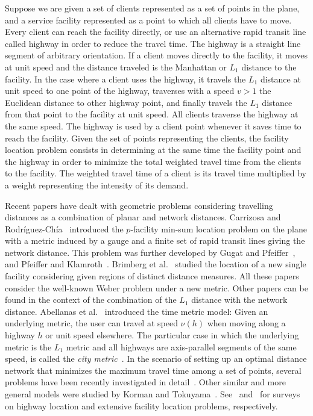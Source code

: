 \documentclass[11pt,a4paper,oneside,onecolumn]{article}
\begin{document}
Suppose we are given a set of clients represented as a set of points in
the plane, and a service facility represented as a point to which
all clients have to move. Every client can reach the facility
directly, or use an alternative rapid transit line called highway in order to reduce the
travel time. The highway is a straight line segment of arbitrary
orientation.
If a client moves
directly to the facility, it moves at unit speed and the distance
traveled is the Manhattan or $L_1$ distance to the facility. In the
case where a client uses the highway, it travels the $L_1$ distance
at unit speed to one point of the highway, traverses with a speed
$v>1$ the Euclidean distance to other highway point, and
finally travels the $L_1$ distance from that point to the facility
at unit speed. All clients traverse the highway at the same speed.
The highway is used by a client point whenever it saves time to reach
the facility.
Given the set of points representing the clients, the facility
location problem consists in determining at the same time the
facility point and the highway in order to minimize the total
weighted travel time from the clients to the facility. The weighted
travel time of a client is its travel time multiplied by a weight
representing the intensity of its demand.

Recent papers have dealt with geometric problems considering
travelling distances as a combination of planar and network distances.
Carrizosa and Rodr\'iguez-Ch\'ia~\cite{carrisoza1997} introduced the
$p$-facility min-sum location problem on the plane with a metric 
induced by a gauge and a finite set of rapid transit lines giving the network distance.
This problem was further developed by 
Gugat and Pfeiffer~\cite{gugat2007}, and Pfeiffer and Klamroth~\cite{pfeiffer2008}.
Brimberg et al.~\cite{brimberg2003,brimberg2005} studied 
the location of a new single facility
considering given regions of distinct distance measures.
All these papers consider the well-known
Weber problem under a new metric.
Other papers can be found in the context of the combination of the 
$L_1$ distance with the network distance.
Abellanas et al.~\cite{abellanas03}
introduced the time metric model: Given an
underlying metric, the user can travel at speed $\nu(h)$ when moving
along a highway $h$ or unit speed elsewhere. The particular case in
which the underlying metric is the $L_1$ metric and all highways are
axis-parallel segments of the same speed, is called the {\em city
metric}~\cite{aichholzer02}. 
In the scenario of setting up an optimal distance network
that minimizes the maximum travel time among a
set of points, several problems have been recently investigated in detail~\cite{ahn07,aloupis10,cardinal08}. Other similar and more general models
were studied by Korman and Tokuyama~\cite{korman08}.
See~\cite{phdkorman} and~\cite{dbanezMS04} for surveys on highway location 
and extensive facility location problems, respectively.
\end{document}
